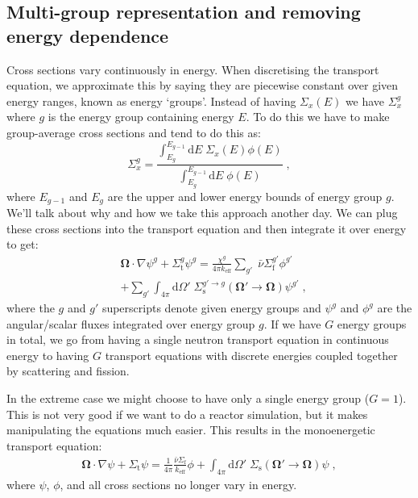 \documentclass{article}
\begin{document}
\subsection{Multi-group representation and removing energy dependence}
Cross sections vary continuously in energy. When discretising the transport equation, we approximate this by saying they are piecewise constant over given energy ranges, known as energy `groups'. Instead of having $\Sigma_x(E)$ we have $\Sigma^g_x$ where $g$ is the energy group containing energy $E$. To do this we have to make group-average cross sections and tend to do this as:
\begin{equation}
    \Sigma^g_x = \frac{\int^{E_{g-1}}_{E_g}\mathrm{d}E\; \Sigma_x(E)\phi(E)}{\int^{E_{g-1}}_{E_g}\mathrm{d}E\; \phi(E)}\;\mathrm{,}
\end{equation}
where $E_{g-1}$ and $E_g$ are the upper and lower energy bounds of energy group $g$. We'll talk about why and how we take this approach another day. We can plug these cross sections into the transport equation and then integrate it over energy to get:
\begin{equation}
    \begin{split}
 &\mathbf{\Omega}\cdot\nabla\psi^g + \Sigma^g_\mathrm{t}\psi^g
    =\frac{\chi^g}{4\pi k_\mathrm{eff}}\sum_{g'} \;\bar{\nu}\Sigma^{g'}_\mathrm{f}\phi^{g'} \\
    &+\sum_{g'}\int_{4\pi}\mathrm{d}{\Omega}' \;\Sigma^{g'\rightarrow g}_\mathrm{s}\left(\mathbf{\Omega}'\rightarrow\mathbf{\Omega}\right)\psi^{g'}\;\mathrm{,}
    \end{split}
\end{equation}
where the $g$ and $g'$ superscripts denote given energy groups and $\psi^g$ and $\phi^g$ are the angular/scalar fluxes integrated over energy group $g$. If we have $G$ energy groups in total, we go from having a single neutron transport equation in continuous energy to having $G$ transport equations with discrete energies coupled together by scattering and fission.

In the extreme case we might choose to have only a single energy group ($G=1$). This is not very good if we want to do a reactor simulation, but it makes manipulating the equations much easier. This results in the monoenergetic transport equation:
\begin{equation}
    \begin{split}
 \mathbf{\Omega}\cdot\nabla\psi + \Sigma_\mathrm{t}\psi
    =\frac{1}{4\pi}\frac{\bar{\nu}\Sigma_\mathrm{f}}{ k_\mathrm{eff}}\phi +\int_{4\pi}\mathrm{d}{\Omega}' \;\Sigma_\mathrm{s}\left(\mathbf{\Omega}'\rightarrow\mathbf{\Omega}\right)\psi\;\mathrm{,}
    \end{split}
\end{equation}
where $\psi$, $\phi$, and all cross sections no longer vary in energy.
\end{document}
